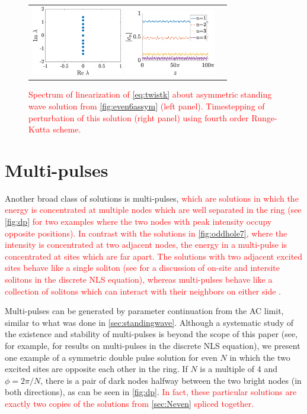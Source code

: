 \documentclass[reprint, amsmath,amssymb,aps,pra]{revtex4-2}
\renewcommand{\revised}[1]{ \textcolor{red}{#1} }
\begin{document}
\begin{figure}
    \begin{center}
    \begin{tabular}{cc}
    \includegraphics[width=4cm]{even6assymspec.eps}
    \includegraphics[width=4cm]{assym6pert.eps}
    \end{tabular}
    \end{center}
    \caption{\revised{Spectrum of linearization of \cref{eq:twistk} about asymmetric standing wave solution from \cref{fig:even6assym} (left panel). Timestepping of perturbation of this solution (right panel) using fourth order Runge-Kutta scheme.}}
    \label{fig:assymstab}
    \end{figure}

\section{Multi-pulses}

Another broad class of solutions is multi-pulses, \revised{which are solutions in which the energy is concentrated at multiple nodes which are well separated in the ring (see \cref{fig:dp} for two examples where the two nodes with peak intensity occupy opposite positions). In contrast with the solutions in \cref{fig:oddhole7}, where the intensity is concentrated at two adjacent nodes, the energy in a multi-pulse is concentrated at sites which are far apart. The solutions with two adjacent excited sites behave like a single soliton (see \cite{Kevrekidis2009} for a discussion of on-site and intersite solitons in the discrete NLS equation), whereas multi-pulses behave like a collection of solitons which can interact with their neighbors on either side \cite{Parker2020}.}

Multi-pulses can be generated by parameter continuation from the AC limit, similar to what was done in \cref{sec:standingwave}. Although a systematic study of the existence and stability of multi-pulses is beyond the scope of this paper (see, for example, \cite{Parker2020} for results on multi-pulses in the discrete NLS equation), we present one example of a symmetric double pulse solution for even $N$ in which the two excited sites are opposite each other in the ring. If $N$ is a multiple of 4 and $\phi = 2\pi/N$, there is a pair of dark nodes halfway between the two bright nodes (in both directions), as can be seen in \cref{fig:dp}. \revised{In fact, these particular solutions are exactly two copies of the solutions from \cref{sec:Neven} spliced together.} 
\end{document}
